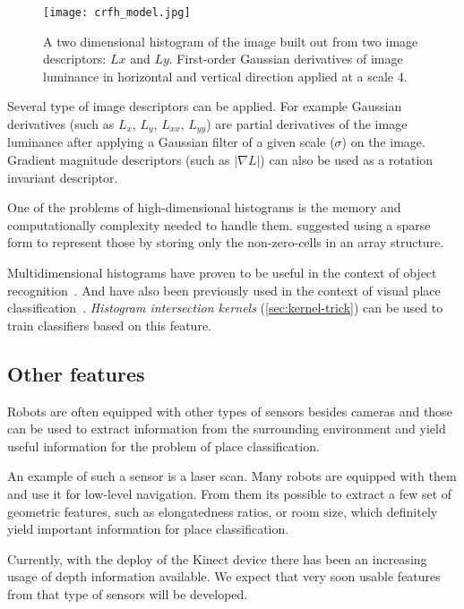 \begin{figure}[h]
\begin{center}
\texttt{[image: crfh\_model.jpg]}
\end{center}
\caption{A two dimensional histogram of the image built out from two image descriptors: $Lx$ and $Ly$. First-order Gaussian derivatives of image luminance in horizontal and vertical direction applied at a scale 4.}
\end{figure}

Several type of image descriptors can be applied.
For example Gaussian derivatives (such as $L_x$, $L_y$, $L_{xx}$, $L_{yy}$) are partial derivatives of the image luminance after applying a Gaussian filter of a given scale ($\sigma$) on the image.
Gradient magnitude descriptors (such as $|\nabla L|$) can also be used as a rotation invariant descriptor.


One of the problems of high-dimensional histograms is the memory and computationally complexity needed to handle them.
\cite{linde2004object} suggested using a sparse form to represent those by storing only the non-zero-cells in an array structure.

Multidimensional histograms have proven to be useful in the context of object recognition~\citep{schiele1996object}. And have also been previously used in the context of visual place classification~\cite{pronobis2010ijrr}.
\emph{Histogram intersection kernels} (\autoref{sec:kernel-trick}) can be used to train classifiers based on this feature.


\subsection{Other features}
Robots are often equipped with other types of sensors besides cameras and those can be used to extract information from the surrounding environment and yield useful information for the problem of place classification.

An example of such a sensor is a laser scan. Many robots are equipped with them and use it for low-level navigation.
From them its possible to extract a few set of geometric features, such as elongatedness ratios, or room size, which definitely yield important information for place classification.

Currently, with the deploy of the \gls{Kinect} device there has been an increasing usage of depth information available.
We expect that very soon usable features from that type of sensors will be developed.

